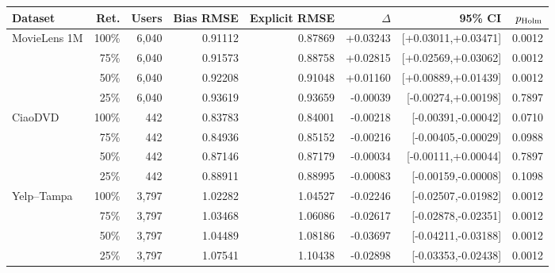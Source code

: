 \begin{table}[H]
{\begin{tabular}{@{}lrrrrrrr@{}}
\toprule
Dataset & Ret. & Users & Bias RMSE & Explicit RMSE & $\Delta$ & 95\% CI & $p_{\rm Holm}$ \\
\midrule
MovieLens 1M & 100\% & 6,040 & 0.91112 & 0.87869 & +0.03243 & [+0.03011,+0.03471] & 0.0012 \\
 & 75\% & 6,040 & 0.91573 & 0.88758 & +0.02815 & [+0.02569,+0.03062] & 0.0012 \\
 & 50\% & 6,040 & 0.92208 & 0.91048 & +0.01160 & [+0.00889,+0.01439] & 0.0012 \\
 & 25\% & 6,040 & 0.93619 & 0.93659 & -0.00039 & [-0.00274,+0.00198] & 0.7897 \\
\addlinespace
CiaoDVD & 100\% & 442 & 0.83783 & 0.84001 & -0.00218 & [-0.00391,-0.00042] & 0.0710 \\
 & 75\% & 442 & 0.84936 & 0.85152 & -0.00216 & [-0.00405,-0.00029] & 0.0988 \\
 & 50\% & 442 & 0.87146 & 0.87179 & -0.00034 & [-0.00111,+0.00044] & 0.7897 \\
 & 25\% & 442 & 0.88911 & 0.88995 & -0.00083 & [-0.00159,-0.00008] & 0.1098 \\
\addlinespace
Yelp--Tampa & 100\% & 3,797 & 1.02282 & 1.04527 & -0.02246 & [-0.02507,-0.01982] & 0.0012 \\
 & 75\% & 3,797 & 1.03468 & 1.06086 & -0.02617 & [-0.02878,-0.02351] & 0.0012 \\
 & 50\% & 3,797 & 1.04489 & 1.08186 & -0.03697 & [-0.04211,-0.03188] & 0.0012 \\
 & 25\% & 3,797 & 1.07541 & 1.10438 & -0.02898 & [-0.03353,-0.02438] & 0.0012 \\
\bottomrule
\end{tabular}%
}
\end{table}
